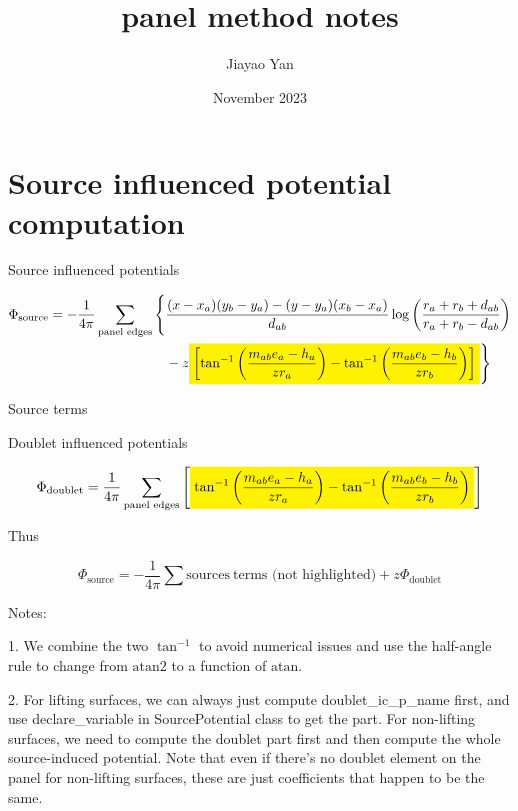 \documentclass{article}
\title{panel method notes}
\author{Jiayao Yan}
\date{November 2023}
\begin{document}
\maketitle

\section{
Source influenced potential computation
}

Source influenced potentials

\begin{equation}
\begin{aligned}
    \Phi_{\text{source}} = -\frac{1}{4\pi} \sum_{\text{panel edges}} \Bigg\{ &
        \frac{(x - x_a)(y_b - y_a) - (y - y_a)(x_b - x_a)}{d_{ab}} 
        \log \left( 
            \frac{r_a + r_b + d_{ab}}{r_a + r_b - d_{ab}} 
        \right) \\
    & - z \colorbox{yellow}{$\displaystyle \left[ 
        \tan^{-1}\left( \frac{m_{ab}e_a - h_a}{zr_a} \right) 
        - \tan^{-1}\left( \frac{m_{ab}e_b - h_b}{zr_b} \right) 
    \right]$} \Bigg\}
\end{aligned}
\end{equation}

Source terms

Doublet influenced potentials

\begin{equation}
    \Phi_{\text{doublet}} = \frac{1}{4\pi} \sum_{\text{panel edges}} \left[ \colorbox{yellow}{$\displaystyle \tan^{-1}\left( \frac{m_{ab}e_a - h_a}{zr_a} \right) - \tan^{-1}\left( \frac{m_{ab}e_b - h_b}{zr_b} \right)$} \right]
\end{equation}

Thus

\[
\Phi_{\text{source}} = -\frac{1}{4\pi} \sum \text{sources} \ \text{terms (not highlighted)} + z \Phi_{\text{doublet}} 
\]

Notes:

1. We combine the two $\tan^{-1}$ to avoid numerical issues and use the half-angle rule to change from $\text{atan2}$ to a function of $\text{atan}$.

2. For lifting surfaces, we can always just compute doublet\_ic\_p\_name first, and use declare\_variable in SourcePotential class to get the part. For non-lifting surfaces, we need to compute the doublet part first and then compute the whole source-induced potential. Note that even if there's no doublet element on the panel for non-lifting surfaces, these are just coefficients that happen to be the same.
\end{document}

